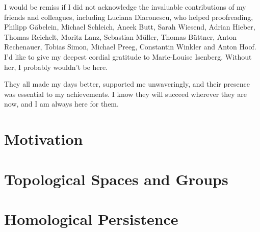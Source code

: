 \documentclass[12pt]{report}
\numberwithin{conj}{section}
\begin{document}
I would be remiss if I did not acknowledge the invaluable contributions of my friends and colleagues, including Luciana Diaconescu, who helped proofreading, Philipp Gäbelein, Michael Schleich, Aneek Butt, Sarah Wiesend, Adrian Hieber, Thomas Reichelt, Moritz Lanz, Sebastian Müller, Thomas Büttner, Anton Rechenauer, Tobias Simon, Michael Preeg, Constantin Winkler and Anton Hoof. I'd like to give my deepest cordial gratitude to Marie-Louise Isenberg. Without her, I probably wouldn't be here.

They all made my days better, supported me unwaveringly, and their presence was essential to my achievements. I know they will succeed wherever they are now, and I am always here for them.

\newpage
\tableofcontents

\singlespacing
\chapter{Motivation}


\chapter{Topological Spaces and Groups}


\chapter{Homological Persistence}


\singlespacing
\printbibliography

\newpage
\printindex
\end{document}
